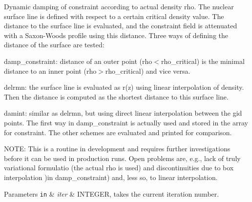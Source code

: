 Dynamic damping of constraint according to actual density \textquotesingle{}rho\textquotesingle{}. The nuclear surface line is defined with respect to a certain critical density value. The distance to the surface line is evaluated, and the constraint field is attenuated with a Saxon-\/\+Woods profile using this distance.  Three ways of defining the distance of the surface are tested\+: 


\begin{DoxyItemize}
\item damp\+\_\+constraint\+: distance of an outer point (rho$<$rho\+\_\+critical) is the minimal distance to an inner point (rho$>$rho\+\_\+critical) and vice versa.
\item delrmn\+: the surface line is evaluated as r(z) using linear interpolation of density. Then the distance is computed as the shortest distance to this surface line.
\item damint\+: similar as {\ttfamily delrmn}, but using direct linear interpolation between the gid points. The first way in \textquotesingle{}damp\+\_\+constraint\textquotesingle{} is actually used and stored in the array for constraint. The other schemes are evaluated and printed for comparison.
\end{DoxyItemize}

N\+O\+TE\+: This is a routine in development and requires further investigations before it can be used in production runs. Open problems are, e.\+g., lack of truly variational formulatio (the actual \textquotesingle{}rho\textquotesingle{} is used) and discontinuities due to box interpolation )in \textquotesingle{}damp\+\_\+constraint\textquotesingle{}) and, less so, to linear interpolation.


\begin{DoxyParams}[1]{Parameters}
\mbox{\tt in}  & {\em iter} & I\+N\+T\+E\+G\+ER, takes the current iteration number. \\
\hline
\end{DoxyParams}
